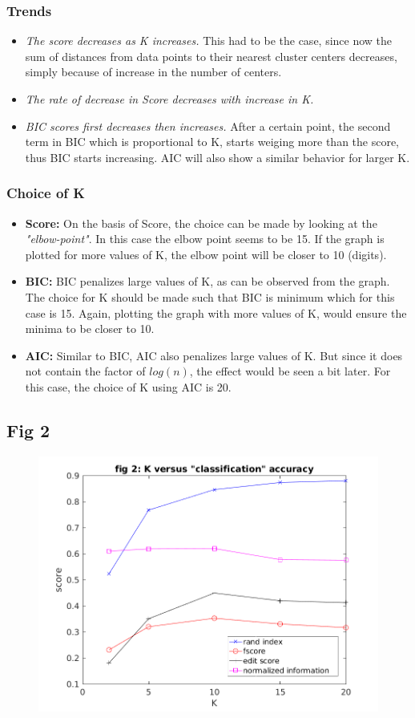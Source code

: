 \documentclass{article}
\begin{document}
\subsubsection{Trends}
\begin{itemize}
\item \emph{The score decreases as K increases.} This had to be the case, since now the sum of distances from data points to their nearest cluster centers decreases, simply because of increase in the number of centers.
\item \emph{The rate of decrease in Score decreases with increase in K.}
\item \emph{BIC scores first decreases then increases.} After a certain point, the second term in BIC which is proportional to  K, starts weiging more than the score, thus BIC starts increasing. AIC will also show a similar behavior for larger K.
\end{itemize}

\subsubsection{Choice of K}
\begin{itemize}
\item \textbf{Score: } On the basis of Score, the choice can be made by looking at the \emph{"elbow-point"}. In this case the elbow point seems to be 15. If the graph is plotted for more values of K, the elbow point will be closer to 10 (digits).
\item \textbf{BIC: }BIC penalizes large values of K, as can be observed from the graph. The choice for K should be made such that BIC is minimum which for this case is 15. Again, plotting the graph with more values of K, would ensure the minima to be closer to 10.
\item \textbf{AIC: }Similar to BIC, AIC also penalizes large values of K. But since it does not contain the factor of $log(n)$, the effect would be seen a bit later. For this case, the choice of K using AIC is 20.
\end{itemize}

\subsection{Fig 2}
\begin{figure}[h!]
\begin{center}
\includegraphics[width=.5\columnwidth]{RunResults2/2.png}
\label{2}
\end{center}
\end{figure}
\end{document}
